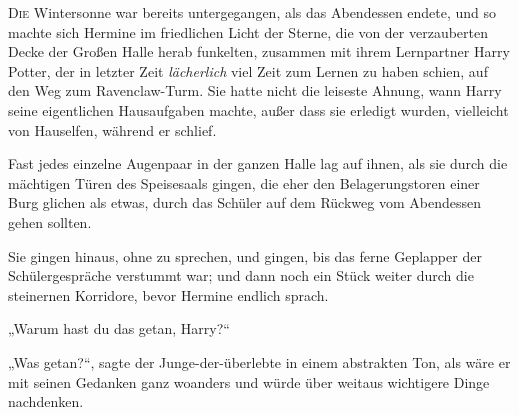 
\lettrine{D}{ie} Wintersonne war bereits untergegangen, als das Abendessen endete, und so machte sich Hermine im friedlichen Licht der Sterne, die von der verzauberten Decke der Großen Halle herab funkelten, zusammen mit ihrem Lernpartner Harry Potter, der in letzter Zeit \emph{lächerlich} viel Zeit zum Lernen zu haben schien, auf den Weg zum Ravenclaw-Turm. Sie hatte nicht die leiseste Ahnung, wann Harry seine eigentlichen Hausaufgaben machte, außer dass sie erledigt wurden, vielleicht von Hauselfen, während er schlief.

Fast jedes einzelne Augenpaar in der ganzen Halle lag auf ihnen, als sie durch die mächtigen Türen des Speisesaals gingen, die eher den Belagerungstoren einer Burg glichen als etwas, durch das Schüler auf dem Rückweg vom Abendessen gehen sollten.

Sie gingen hinaus, ohne zu sprechen, und gingen, bis das ferne Geplapper der Schülergespräche verstummt war; und dann noch ein Stück weiter durch die steinernen Korridore, bevor Hermine endlich sprach.

„Warum hast du das getan, Harry?“

„Was getan?“, sagte der Junge-der-überlebte in einem abstrakten Ton, als wäre er mit seinen Gedanken ganz woanders und würde über weitaus wichtigere Dinge nachdenken.

